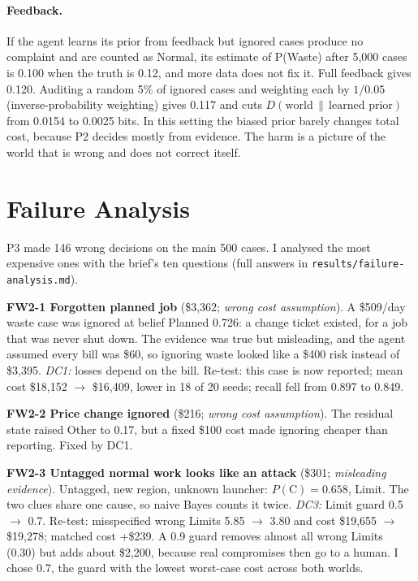 \documentclass{article}
\newcommand{\Pc}{P(\mathrm{C})}
\begin{document}
\paragraph{Feedback.} If the agent learns its prior from feedback but ignored cases produce no complaint and are counted as Normal, its estimate of P(Waste) after 5,000 cases is 0.100 when the truth is 0.12, and more data does not fix it. Full feedback gives 0.120. Auditing a random 5\% of ignored cases and weighting each by $1/0.05$ (inverse-probability weighting) gives 0.117 and cuts $D(\text{world}\,\|\,\text{learned prior})$ from 0.0154 to 0.0025 bits. In this setting the biased prior barely changes total cost, because P2 decides mostly from evidence. The harm is a picture of the world that is wrong and does not correct itself.

\section{Failure Analysis}
\label{sec:fail}

P3 made 146 wrong decisions on the main 500 cases. I analysed the most expensive ones with the brief's ten questions (full answers in \texttt{results/failure-analysis.md}).

\textbf{FW2-1 Forgotten planned job} (\$3,362; \emph{wrong cost assumption}). A \$509/day waste case was ignored at belief Planned 0.726: a change ticket existed, for a job that was never shut down. The evidence was true but misleading, and the agent assumed every bill was \$60, so ignoring waste looked like a \$400 risk instead of \$3,395. \emph{DC1:} losses depend on the bill. Re-test: this case is now reported; mean cost \$18,152 $\rightarrow$ \$16,409, lower in 18 of 20 seeds; recall fell from 0.897 to 0.849.

\textbf{FW2-2 Price change ignored} (\$216; \emph{wrong cost assumption}). The residual state raised Other to 0.17, but a fixed \$100 cost made ignoring cheaper than reporting. Fixed by DC1.

\textbf{FW2-3 Untagged normal work looks like an attack} (\$301; \emph{misleading evidence}). Untagged, new region, unknown launcher: $\Pc = 0.658$, Limit. The two clues share one cause, so naive Bayes counts it twice. \emph{DC3:} Limit guard 0.5 $\rightarrow$ 0.7. Re-test: misspecified wrong Limits 5.85 $\rightarrow$ 3.80 and cost \$19,655 $\rightarrow$ \$19,278; matched cost +\$239. A 0.9 guard removes almost all wrong Limits (0.30) but adds about \$2,200, because real compromises then go to a human. I chose 0.7, the guard with the lowest worst-case cost across both worlds.
\end{document}

